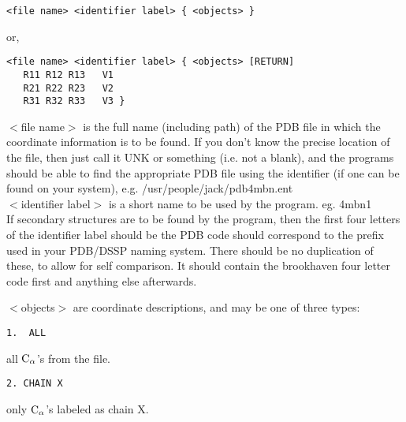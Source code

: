 \begin{scriptsize}\begin{verbatim}
<file name> <identifier label> { <objects> }
\end{verbatim} \end{scriptsize}

or,\\

\begin{scriptsize}\begin{verbatim}
<file name> <identifier label> { <objects> [RETURN]
   R11 R12 R13   V1
   R21 R22 R23   V2
   R31 R32 R33   V3 }
\end{verbatim} \end{scriptsize}

$<$file name$>$ is the full name (including path) of the PDB file in
which the coordinate information is to be found.  If you don't know the 
precise location of the file, then just call it UNK or something (i.e. 
not a blank), and the programs should be able to find the appropriate PDB 
file using the identifier (if one can be found on your system), e.g. 
/usr/people/jack/pdb4mbn.ent\\

$<$identifier label$>$ is a short name to be used by the program. 
eg. 4mbn1\\

If secondary structures are to be found by the program, then the
first  four letters of the identifier label should be the PDB code should
correspond to the prefix used in your PDB/DSSP naming system.
There should be no 
duplication of these, to allow for self comparison.  It should
contain  the brookhaven four letter code first and anything else 
afterwards.

$<$objects$>$ are coordinate descriptions, and may be one of three types:

\begin{scriptsize}\begin{verbatim}
1.  ALL  
\end{verbatim} \end{scriptsize}
all ${\rm C}_{\alpha}$'s from the file.\\

\begin{scriptsize}\begin{verbatim}
2. CHAIN X 
\end{verbatim} \end{scriptsize}
only ${\rm C}_{\alpha}$'s labeled as chain X.\\

